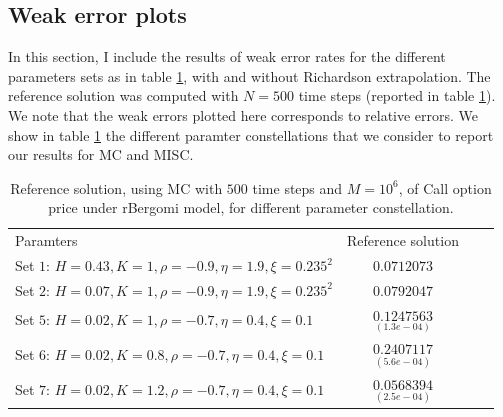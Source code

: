 \documentclass[11pt]{article}
\begin{document}
\subsection{Weak error plots} \label{sec:Weak error plots_no_change}
In this section, I include the results of weak error rates for the different parameters sets as in table \ref{table:Reference solution, using MC with $500$ time steps, of Call option price under rBergomi model, for different parameter constellation.}, with and without Richardson extrapolation. The reference solution was computed with $N=500$ time steps (reported in table \ref{table:Reference solution, using MC with $500$ time steps, of Call option price under rBergomi model, for different parameter constellation.}). We note that the weak errors plotted here corresponds to relative errors. We show in table \ref{table:Reference solution, using MC with $500$ time steps, of Call option price under rBergomi model, for different parameter constellation.} the different paramter constellations that we consider to report our results for MC and MISC.



\begin{table}[!h]
	\centering
	\begin{tabular}{l*{2}{c}r}
		Paramters            & Reference solution    \\
	Set $1$:	$H=0.43, K=1, \rho=-0.9, \eta=1.9,\xi=0.235^2$   & $\underset{}{0.0712073}$  \\	
			Set $2$:	$H=0.07, K=1, \rho=-0.9, \eta=1.9,\xi=0.235^2$   & $\underset{}{0.0792047}$  \\	
				Set $5$:	$H=0.02, K=1, \rho=-0.7, \eta=0.4,\xi=0.1$   & $\underset{(1.3e-04)}{0.1247563}$  \\
					Set $6$:	$H=0.02, K=0.8, \rho=-0.7, \eta=0.4,\xi=0.1$   & $\underset{(5.6e-04)}{0.2407117}$  \\
						Set $7$:	$H=0.02, K=1.2, \rho=-0.7, \eta=0.4,\xi=0.1$   & $\underset{(2.5e-04)}{0.0568394}$  \\
		\hline
	\end{tabular}
	\caption{Reference solution, using MC with $500$ time steps and $M=10^6$, of Call option price under rBergomi model, for different parameter constellation.}
	\label{table:Reference solution, using MC with $500$ time steps, of Call option price under rBergomi model, for different parameter constellation.}
\end{table}
\FloatBarrier
\end{document}
